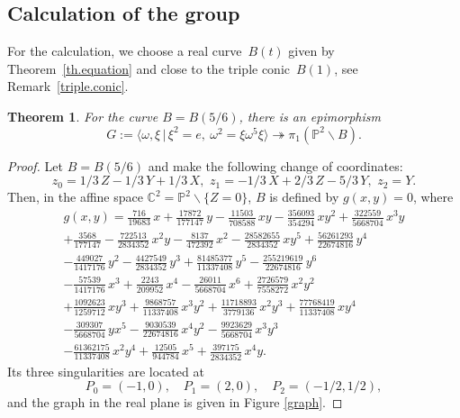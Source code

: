 \documentclass{amsart}
\newtheorem{theorem}[subsubsection]{Theorem}
\theoremstyle{remark}
\numberwithin{equation}{section}
\let\Bbb\mathbb
\let\curve=B
\let\sminus\smallsetminus
\let\1e
\let\Go\omega
\begin{document}
\subsection{Calculation of the
group}

For the calculation, we choose a real curve~$\curve(t)$ given by
Theorem~\ref{th.equation} and close to the triple conic~$\curve(1)$,
see Remark~\ref{triple.conic}.

\begin{theorem}\label{th.epi}
For the curve $\curve=\curve(5/6)$, there is an epimorphism
$$
G:=\langle\Go,\xi\,|\,\xi^2=\1,\ \Go^2=\xi\Go^5\xi\rangle
 \twoheadrightarrow\pi_1({\Bbb P^{2}}\sminus\curve).
$$
\end{theorem}

\begin{proof}
Let $\curve=\curve(5/6)$ and make the following change of coordinates:
\[
z_0= 1/3\,{ Z}-1/3\,Y+1/3\,X,\,\,z_1=-1/3\,X+2/3\,{ Z}-5/3\,Y,\,\,
 z_2=Y.
\]
Then, in the affine space ${\Bbb C}^2={\Bbb P^{2}}\sminus\{Z=0\}$, $\curve$ is defined by
$g(x,y)=0$, where
\begin{multline*}
g(x,y)={\frac {716}{19683}}\,x+{\frac {17872}{177147}}\,y-{\frac {11503}{
708588}}\,xy-{\frac {356093}{354294}}\,x{y}^{2}+{\frac {322559}{
5668704}}\,{x}^{3}y\\
+{\frac {3568}{177147}}-{\frac {722513}{2834352}}\,
{x}^{2}y-{\frac {8137}{472392}}\,{x}^{2}-{\frac {28582655}{2834352}}\,
x{y}^{5}+{\frac {56261293}{22674816}}\,{y}^{4}\\
-{\frac {449027}{1417176
}}\,{y}^{2}-{\frac {4427549}{2834352}}\,{y}^{3}+{\frac {81485377}{
11337408}}\,{y}^{5}-{\frac {255219619}{22674816}}\,{y}^{6}\\
-{\frac {
57539}{1417176}}\,{x}^{3}+{\frac {2243}{209952}}\,{x}^{4}-{\frac {
26011}{5668704}}\,{x}^{6}+{\frac {2726579}{7558272}}\,{x}^{2}{y}^{2}\\
+{
\frac {1092623}{1259712}}\,x{y}^{3}+{\frac {9868757}{11337408}}\,{x}^{
3}{y}^{2}+{\frac {11718893}{3779136}}\,{x}^{2}{y}^{3}+{\frac {77768419
}{11337408}}\,x{y}^{4}\\
-{\frac {309307}{5668704}}\,y{x}^{5}-{\frac {
9030539}{22674816}}\,{x}^{4}{y}^{2}-{\frac {9923629}{5668704}}\,{x}^{3
}{y}^{3}\\
-{\frac {61362175}{11337408}}\,{x}^{2}{y}^{4}+{\frac {12505}{
944784}}\,{x}^{5}+{\frac {397175}{2834352}}\,{x}^{4}y.
\end{multline*}
Its three singularities are located at
\[
 P_0=(-1,0),\quad P_1=(2,0),\quad P_2=(-1/2,1/2),
\]
and the graph in the real plane is given
in
Figure \ref{graph}.


\end{proof}
\end{document}
